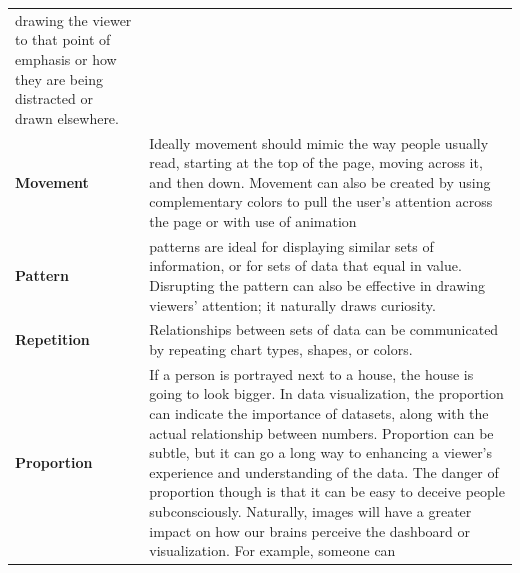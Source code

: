 \documentclass[]{book}
\begin{document}
\begin{longtable}[]{@{}ll@{}}
\begin{minipage}[t]{0.78\columnwidth}
drawing the viewer to that point of emphasis or how they are being
distracted or drawn elsewhere.\strut
\end{minipage}\tabularnewline
\begin{minipage}[t]{0.16\columnwidth}\raggedright\strut
\textbf{Movement}\strut
\end{minipage} & \begin{minipage}[t]{0.78\columnwidth}\raggedright\strut
Ideally movement should mimic the way people usually read, starting at
the top of the page, moving across it, and then down. Movement can also
be created by using complementary colors to pull the user's attention
across the page or with use of animation\strut
\end{minipage}\tabularnewline
\begin{minipage}[t]{0.16\columnwidth}\raggedright\strut
\textbf{Pattern}\strut
\end{minipage} & \begin{minipage}[t]{0.78\columnwidth}\raggedright\strut
patterns are ideal for displaying similar sets of information, or for
sets of data that equal in value. Disrupting the pattern can also be
effective in drawing viewers' attention; it naturally draws
curiosity.\strut
\end{minipage}\tabularnewline
\begin{minipage}[t]{0.16\columnwidth}\raggedright\strut
\textbf{Repetition}\strut
\end{minipage} & \begin{minipage}[t]{0.78\columnwidth}\raggedright\strut
Relationships between sets of data can be communicated by repeating
chart types, shapes, or colors.\strut
\end{minipage}\tabularnewline
\begin{minipage}[t]{0.16\columnwidth}\raggedright\strut
\textbf{Proportion}\strut
\end{minipage} & \begin{minipage}[t]{0.78\columnwidth}\raggedright\strut
If a person is portrayed next to a house, the house is going to look
bigger. In data visualization, the proportion can indicate the
importance of datasets, along with the actual relationship between
numbers. Proportion can be subtle, but it can go a long way to enhancing
a viewer's experience and understanding of the data. The danger of
proportion though is that it can be easy to deceive people
subconsciously. Naturally, images will have a greater impact on how our
brains perceive the dashboard or visualization. For example, someone can

\end{minipage}
\end{longtable}
\end{document}
